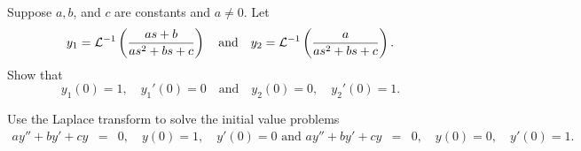 \documentclass{ximera}
\begin{document}
\begin{problem}\label{exer:8.3.38}
Suppose $a,b$, and $c$ are constants and $a\ne0$.  Let
$$
y_1={\cal L}^{-1}\left(\frac{as+b}{as^2+bs+c}\right)\quad\mbox{and}\quad
y_2={\cal L}^{-1}\left(\frac{a}{as^2+bs+c}\right).
$$
Show that
$$
y_1(0)=1,\quad y_1'(0)=0\quad\mbox{and}\quad y_2(0)=0,\quad y_2'(0)=1.
$$
\begin{hint}
Use the Laplace transform to solve the initial value
problems
\begin{eqnarray*}
ay''+by'+cy&=&0, \quad   y(0)=1,\quad y'(0)=0 \text{ and }
ay''+by'+cy&=&0, \quad  y(0)=0,\quad y'(0)=1.
\end{eqnarray*}
\end{hint}
\end{problem}
\end{document}
